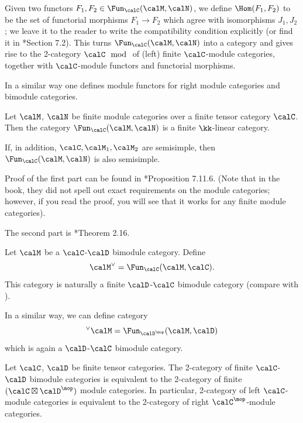 Given two functors $F_1, F_2\in \Fun_\calC(\calM, \calN)$, we define
$\Hom(F_1, F_2)$ to be the set of functorial morphisms $F_1\to F_2$ which agree
with isomorphisms $J_1, J_2$; we leave it to the reader to write the
compatibility condition explicitly (or find it in
*{Section 7.2}). This turns $\Fun_\calC(\calM, \calN)$
into a category and gives rise to the 2-category $\calC\mod$ of (left) finite
$\calC$-module categories, together with $\calC$-module functors and functorial
morphisms.

In a similar way one defines module functors for right module categories
and bimodule categories.


\begin{theorem}\label{t:module-functors}
  Let $\calM$, $\calN$ be finite module categories over a finite tensor
   category $\calC$. Then the category $\Fun_\calC(\calM, \calN)$ is
   a finite $\kk$-linear category.

   If, in addition, $\calC, \calM_1, \calM_2$ are semisimple, then
   $\Fun_\calC(\calM, \calN)$  is also semisimple.
\end{theorem}
Proof of the first part can be found in *{Proposition
7.11.6}. (Note that in the book, they did not spell out exact requirements on
the module categories; however, if you read the proof, you will see that it
works for any finite module categories).

The second part is *{Theorem 2.16}.

\begin{example}\label{x:module-cat-dual}
  Let $\calM$ be a $\calC$-$\calD$ bimodule category. Define
  $$
  \calM^\vee = \Fun_\calC(\calM, \calC).
  $$
  This category is naturally a finite
  $\calD$-$\calC$ bimodule category (compare with ).

  In a similar way, we can define category
  $$
    {}^\vee\calM= \Fun_{\calD^\mop}(\calM, \calD)
  $$
  which is again a $\calD$-$\calC$ bimodule category.
\end{example}




\begin{lemma}\label{l:bimodule-2category}
  Let $\calC$, $\calD$ be finite tensor categories. The 2-category of finite
  $\calC$-$\calD$ bimodule categories is equivalent to the 2-category of finite
  $(\calC\boxtimes \calD^{\mop})$ module categories. In particular, 2-category
  of
  left $\calC$-module categories is equivalent to the 2-category of right
  $\calC^\mop$-module categories.
\end{lemma}



